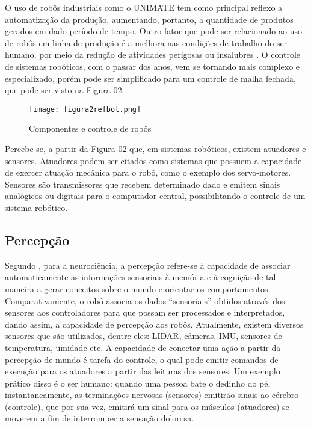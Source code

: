 O uso de robôs industriais como o UNIMATE tem como principal reflexo a automatização da produção, aumentando, portanto, a quantidade de produtos gerados em dado período de tempo. Outro fator que pode ser relacionado ao uso de robôs em linha de produção é a melhora nas condições de trabalho do ser humano, por meio da redução de atividades perigosas ou insalubres \cite{bouteille}.
O controle de sistemas robóticos, com o passar dos anos, vem se tornando mais complexo e especializado, porém pode ser simplificado para um controle de malha fechada, que pode ser visto na Figura 02.

\begin{figure}[h!]												
	\centering												
	\texttt{[image: figura2refbot.png]}			
	\caption{Componentes e controle de robôs}		
	\label{img:denavit}	
\end{figure}

Percebe-se, a partir da Figura 02 que, em sistemas robóticos, existem atuadores e sensores. Atuadores podem ser citados como sistemas que possuem a capacidade de exercer atuação mecânica para o robô, como o exemplo dos servo-motores. Sensores são transmissores que recebem determinado dado e emitem sinais analógicos ou digitais para o computador central, possibilitando o controle de um sistema robótico. 





\subsection{Percepção}\label{sec:perception}
Segundo \cite{lent}, para a neurociência, a percepção refere-se à capacidade de associar automaticamente as informações sensoriais à memória e à cognição de tal maneira a gerar conceitos sobre o mundo e orientar os comportamentos. Comparativamente, o robô associa os dados “sensoriais” obtidos através dos sensores aos controladores para que possam ser processados e interpretados, dando assim, a capacidade de percepção aos robôs. 
Atualmente, existem diversos sensores que são utilizados, dentre eles: LIDAR, câmeras, IMU, sensores de temperatura, umidade etc. A capacidade de conectar uma ação a partir da percepção de mundo é tarefa do controle, o qual pode emitir comandos de execução para os atuadores a partir das leituras dos sensores. Um exemplo prático disso é o ser humano: quando uma pessoa bate o dedinho do pé, instantaneamente, as terminações nervosas (sensores) emitirão sinais ao cérebro (controle), que por sua vez, emitirá um sinal para os músculos (atuadores) se moverem a fim de interromper a sensação dolorosa.    


